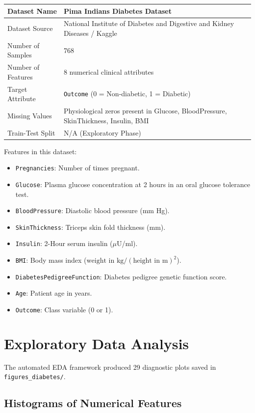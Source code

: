 \documentclass[12pt,a4paper]{article}
\begin{document}
\begin{longtable}{|p{6cm}|p{8cm}|}
\hline
Dataset Name & Pima Indians Diabetes Dataset \\ \hline
Dataset Source & National Institute of Diabetes and Digestive and Kidney Diseases / Kaggle \\ \hline
Number of Samples & 768 \\ \hline
Number of Features & 8 numerical clinical attributes \\ \hline
Target Attribute & \texttt{Outcome} (0 = Non-diabetic, 1 = Diabetic) \\ \hline
Missing Values & Physiological zeros present in Glucose, BloodPressure, SkinThickness, Insulin, BMI \\ \hline
Train-Test Split & N/A (Exploratory Phase) \\ \hline
\end{longtable}

Features in this dataset:
\begin{itemize}[noitemsep]
    \item \texttt{Pregnancies}: Number of times pregnant.
    \item \texttt{Glucose}: Plasma glucose concentration at 2 hours in an oral glucose tolerance test.
    \item \texttt{BloodPressure}: Diastolic blood pressure (mm Hg).
    \item \texttt{SkinThickness}: Triceps skin fold thickness (mm).
    \item \texttt{Insulin}: 2-Hour serum insulin ($\mu$U/ml).
    \item \texttt{BMI}: Body mass index ($\text{weight in kg}/(\text{height in m})^2$).
    \item \texttt{DiabetesPedigreeFunction}: Diabetes pedigree genetic function score.
    \item \texttt{Age}: Patient age in years.
    \item \texttt{Outcome}: Class variable (0 or 1).
\end{itemize}

\section{Exploratory Data Analysis}
The automated EDA framework produced 29 diagnostic plots saved in \texttt{figures\_diabetes/}.

\subsection{Histograms of Numerical Features}
\end{document}
